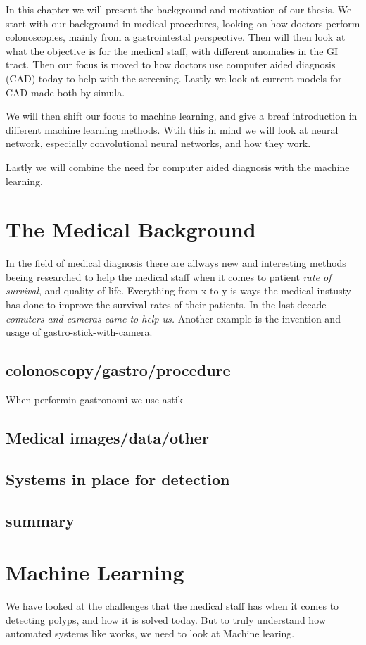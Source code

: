 In this chapter we will present the background and motivation of our thesis.
We start with our background in medical procedures, looking on how doctors perform colonoscopies, mainly from a gastrointestal perspective.
Then will then look at what the objective is for the medical staff, with different anomalies in the GI tract. Then our focus is moved to how doctors 
use computer aided diagnosis (CAD) today to help with the screening. Lastly we look at current models for CAD made both by simula.

We will then shift our focus to machine learning, and give a breaf introduction in different machine learning methods. Wtih this in mind we will look
at neural network, especially convolutional neural networks, and how they work.

Lastly we will combine the need for computer aided diagnosis with the machine learning.
\section{The Medical Background}
    In the field of medical diagnosis there are allways new and interesting methods beeing researched to help the medical staff when it comes to patient \textit{rate of survival}, and quality of life. 
    Everything from x to y is ways the medical instusty has done to improve the survival rates of their patients. 
    In the last decade \textit{comuters and cameras came to help us.}
    Another example is the invention and usage of gastro-stick-with-camera.
    \subsection{colonoscopy/gastro/procedure}
    When performin gastronomi we use astik
    \subsection{Medical images/data/other}
    
    \subsection{Systems in place for detection}
    \subsection{summary}
    

\section{Machine Learning}
    We have looked at the challenges that the medical staff has when it comes to detecting polyps, and how it is solved today.
    But to truly understand how automated systems like  works, we need to look at Machine learing.  
    
